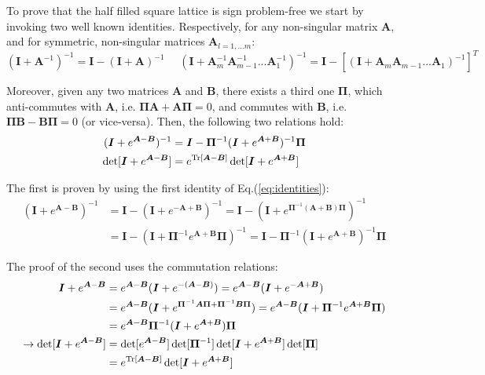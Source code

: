 
To prove that the half filled square lattice is sign problem-free we start by invoking two well known identities.
Respectively, for any non-singular matrix $\bm A$, and for symmetric, non-singular matrices $\bm A_{l=1,... m}$:
\begin{equation}\label{eq:identities}
( \bm I + \bm A^{-1} )^{-1}  = \bm I - ( \bm I + \bm A )^{-1} \,\,\,\, \,\,\,\, ( \bm I + \bm A_m^{-1}  \bm A_{m-1}^{-1}  ...  \bm A_{1}^{-1} )^{-1} =  \bm I - [ ( \bm I + \bm A_m \bm A_{m-1} ... \bm A_1 )^{-1} ]^T
\end{equation}

Moreover, given any two matrices $\bm A$ and $\bm B$, there exists a third one $\bm \Pi$, which anti-commutes with $\bm A$, i.e. $ \bm \Pi \bm A  + \bm A \bm \Pi = 0$, and commutes with $\bm B$, i.e. $ \bm \Pi \bm B  - \bm B \bm \Pi = 0$ (or vice-versa).
Then, the following two relations hold:
\begin{equation}
\begin{split}
( \bm I + e^{\bm A - \bm B} )^{-1} &= \bm I - \bm \Pi^{-1} ( \bm I + e^{\bm A + \bm B} )^{-1} \bm \Pi \\
\det [ \bm I + e^{\bm A - \bm B} ] &= e^{\operatorname{Tr} [\bm A - \bm B ]} \det [ \bm I + e^{\bm A + \bm B} ]
\end{split}
\end{equation}

The first is proven by using the first identity of Eq.(\ref{eq:identities}):
\begin{equation}
\begin{split}
( \bm I + e^{\bm A - \bm B} )^{-1} &= \bm I - ( \bm I + e^{-\bm A + \bm B} )^{-1}  = \bm I - ( \bm I + e^{\bm \Pi^{-1} ( \bm A + \bm B) \bm \Pi } )^{-1} \\
&= \bm I - ( \bm I + \bm \Pi^{-1} e^{\bm A + \bm B} \bm \Pi )^{-1} = \bm I - \bm \Pi^{-1} ( \bm I + e^{\bm A + \bm B} )^{-1} \bm \Pi
\end{split}
\end{equation}

The proof of the second uses the commutation relations:
\begin{equation}
\begin{split}
\bm I + e^{\bm A - \bm B} &= e^{\bm A - \bm B} ( \bm I + e^{-(\bm A - \bm B)} ) = e^{\bm A - \bm B} ( \bm I + e^{-\bm A + \bm B} ) \\
&=e^{\bm A - \bm B} ( \bm I + e^{\bm \Pi^{-1} \bm A \bm \Pi +\bm \Pi^{-1} \bm B \bm \Pi  } ) = e^{\bm A - \bm B} ( \bm I + \bm \Pi^{-1} e^{\bm A + \bm B} \bm \Pi ) \\
&= e^{\bm A - \bm B}  \bm \Pi^{-1} ( \bm I + e^{\bm A + \bm B} ) \bm \Pi \\
\rightarrow \det [ \bm I + e^{\bm A - \bm B} ]&= \det [ e^{\bm A - \bm B} ] \det [ \bm \Pi^{-1} ] \det [ \bm I + e^{\bm A + \bm B} ] \det [ \bm \Pi ] \\
&= e^{ \operatorname{Tr} [ \bm A - \bm B ] } \det [ \bm I + e^{\bm A + \bm B} ]
\end{split}
\end{equation}

